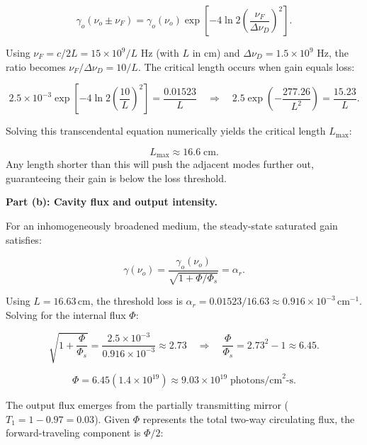 \begin{equation*}
  \gamma_o(\nu_o \pm \nu_F) = \gamma_o(\nu_o) \exp\left[ -4\ln 2 \left( \frac{\nu_F}{\Delta\nu_D} \right)^2 \right].
\end{equation*}

Using $\nu_F = c/2L = 15\times10^{9}/L$ Hz (with $L$ in cm) and $\Delta\nu_D = 1.5\times10^{9}$ Hz, the ratio becomes $\nu_F/\Delta\nu_D = 10/L$. The critical length occurs when gain equals loss:

\begin{equation*}
  2.5\times10^{-3} \exp\left[ -4\ln 2 \left(\frac{10}{L}\right)^2 \right] = \frac{0.01523}{L}
  \quad\Longrightarrow\quad 2.5 \exp\left( -\frac{277.26}{L^2} \right) = \frac{15.23}{L}.
\end{equation*}

Solving this transcendental equation numerically yields the critical length $L_{\max}$:

\begin{equation*}
  \boxed{L_{\max} \approx 16.6\;\text{cm}.}
\end{equation*}
Any length shorter than this will push the adjacent modes further out, guaranteeing their gain is below the loss threshold.

\textbf{Part (b): Cavity flux and output intensity.}

For an inhomogeneously broadened medium, the steady-state saturated gain satisfies:

\begin{equation*}
  \gamma(\nu_o) = \frac{\gamma_o(\nu_o)}{\sqrt{1 + \Phi/\Phi_s}} = \alpha_r.
\end{equation*}

Using $L = 16.63$\,cm, the threshold loss is $\alpha_r = 0.01523 / 16.63 \approx 0.916\times10^{-3}$\,cm$^{-1}$. Solving for the internal flux $\Phi$:

\begin{equation*}
  \sqrt{1 + \frac{\Phi}{\Phi_s}} = \frac{2.5\times10^{-3}}{0.916\times10^{-3}} \approx 2.73
  \quad\Longrightarrow\quad \frac{\Phi}{\Phi_s} = 2.73^2 - 1 \approx 6.45.
\end{equation*}

\begin{equation*}
  \boxed{\Phi = 6.45(1.4\times10^{19}) \approx 9.03\times10^{19}\;\text{photons/cm}^{2}\text{-s}.}
\end{equation*}

The output flux emerges from the partially transmitting mirror ($T_1 = 1 - 0.97 = 0.03$). Given $\Phi$ represents the total two-way circulating flux, the forward-traveling component is $\Phi/2$:

